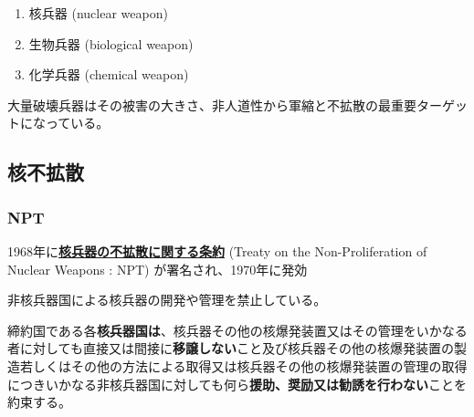 \documentclass[
  xelatex,
  ja=standard]{bxjsarticle}
\providecommand{\tightlist}{%
  \setlength{\itemsep}{0pt}\setlength{\parskip}{0pt}}\usepackage{longtable,booktabs,array}
\begin{document}
\begin{enumerate}
\def\labelenumi{\arabic{enumi}.}
\tightlist
\item
  核兵器 (nuclear weapon)
\item
  生物兵器 (biological weapon)
\item
  化学兵器 (chemical weapon)
\end{enumerate}

大量破壊兵器はその被害の大きさ、非人道性から軍縮と不拡散の最重要ターゲットになっている。

\hypertarget{ux6838ux4e0dux62e1ux6563}{%
\subsection{核不拡散}\label{ux6838ux4e0dux62e1ux6563}}

\hypertarget{npt}{%
\subsubsection{NPT}\label{npt}}

1968年に\href{https://www.mofa.go.jp/mofaj/gaiko/treaty/pdfs/B-S51-0403.pdf}{\textbf{核兵器の不拡散に関する条約}}
(Treaty on the Non-Proliferation of Nuclear Weapons : NPT)
が署名され、1970年に発効

非核兵器国による核兵器の開発や管理を禁止している。

\begin{tcolorbox}[enhanced jigsaw, opacityback=0, bottomtitle=1mm, arc=.35mm, opacitybacktitle=0.6, title=\textcolor{quarto-callout-note-color}{\faInfo}\hspace{0.5em}{\href{https://www1.doshisha.ac.jp/~karai/intlaw/docs/npt.htm}{核兵器不拡散条約}　第1条}, bottomrule=.15mm, coltitle=black, toptitle=1mm, titlerule=0mm, leftrule=.75mm, colframe=quarto-callout-note-color-frame, breakable, left=2mm, rightrule=.15mm, toprule=.15mm, colbacktitle=quarto-callout-note-color!10!white, colback=white]

締約国である各\textbf{核兵器国は}、核兵器その他の核爆発装置又はその管理をいかなる者に対しても直接又は間接に\textbf{移譲しない}こと及び核兵器その他の核爆発装置の製造若しくはその他の方法による取得又は核兵器その他の核爆発装置の管理の取得につきいかなる非核兵器国に対しても何ら\textbf{援助、奨励又は勧誘を行わない}ことを約束する。

\end{tcolorbox}
\end{document}
